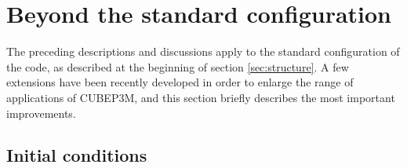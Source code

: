 \documentclass[useAMS,usenatbib]{mn2e}
\begin{document}
%




%

\section{Beyond the standard configuration}
\label{sec:extensions}

The preceding descriptions and discussions apply to the standard configuration of the code, 
as described at the beginning of section \ref{sec:structure}. A few extensions have been recently developed
in order to enlarge the range of applications of {\small CUBEP3M}, and this section briefly 
describes the most important improvements.

\subsection{Initial conditions}
\label{subsec:init}
\end{document}
